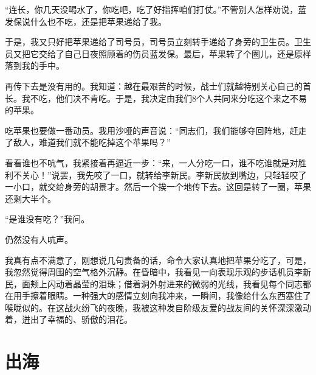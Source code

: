 \documentclass[12pt,UTF-8,openany]{ctexbook}
\begin{document}
\begin{Large}
    “连长，你几天没喝水了，你吃吧，吃了好指挥咱们打仗。”不管别人怎样劝说，蓝发保说什么也不吃，还是把苹果递给了我。
    
    于是，我又只好把苹果递给了司号员，司号员立刻转手递给了身旁的卫生员。卫生员又把它交给了自己日夜照顾着的伤员蓝发保。最后，苹果转了个圈儿，还是原样落到我的手中。
    
    再传下去是没有用的。我知道：越在最艰苦的时候，战士们就越特别关心自己的首长。我不吃，他们决不肯吃。于是，我决定由我们8个人共同来分吃这个来之不易的苹果。
    
    吃苹果也要做一番动员。我用沙哑的声音说：“同志们，我们能够夺回阵地，赶走了敌人，难道我们就不能吃掉这个苹果吗？”
    
    看看谁也不吭气，我紧接着再逼近一步：“来，一人分吃一口，谁不吃谁就是对胜利不关心！”说罢，我先咬了一口，就转给李新民。李新民放到嘴边，只轻轻咬了一小口，就交给身旁的胡景才。然后一个挨一个地传下去。这回是转了一圈，苹果还剩大半个。
    
    “是谁没有吃？”我问。
    
    仍然没有人吭声。
    
    我真有点不满意了，刚想说几句责备的话，命令大家认真地把苹果分吃了，可是，我忽然觉得周围的空气格外沉静。在昏暗中，我看见一向表现乐观的步话机员李新民，面颊上闪动着晶莹的泪珠；借着洞外射进来的微弱的光线，我看见每个同志都在用手擦着眼睛。一种强大的感情立刻向我冲来，一瞬间，我像给什么东西塞住了喉咙似的。在这战火纷飞的夜晚，我被这种发自阶级友爱的战友间的关怀深深激动着，迸出了幸福的、骄傲的泪花。
    
\end{Large}

\chapter{出海}
\end{document}
